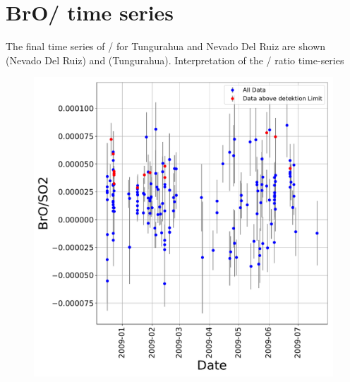 \documentclass  [
  paper    = a4,
  BCOR     = 10mm,
  twoside,
  fontsize = 12pt,
  fleqn,
  toc      = bibnumbered,
  toc      = listofnumbered,
  numbers  = noendperiod,
  headings = normal,
  listof   = leveldown,
  version  = 3.03
]                                       {scrreprt}
\begin{document}
\section{BrO/  time series}
The final time series of /  for Tungurahua and Nevado Del Ruiz are shown  (Nevado Del Ruiz) and  (Tungurahua).
	Interpretation of the / ratio time-series
	\begin{figure}
		\centering
		\includegraphics[width=0.7\linewidth]{Bilder/Results/Results_Tungurahua}
		\caption{}
		\label{fig:resultstungurahua}
	\end{figure}
\end{document}
